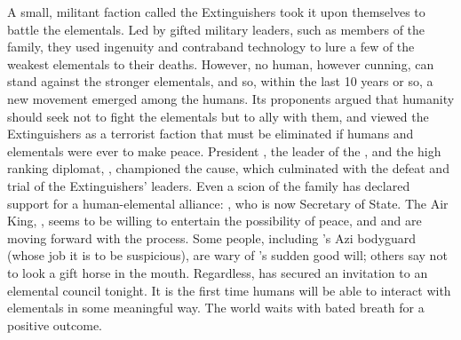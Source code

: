 \documentclass[blue]{elementals}
\begin{document}
A small, militant faction called the Extinguishers took it upon themselves to battle the elementals.  Led by gifted military leaders, such as members of the \cDema{\formal} family, they used ingenuity and contraband technology to lure a few of the weakest elementals to their deaths.  However, no human, however cunning, can stand against the stronger elementals, and so, within the last 10 years or so, a new movement emerged among the humans. Its proponents argued that humanity should seek not to fight the elementals but to ally with them, and viewed the Extinguishers as a terrorist faction that must be eliminated if humans and elementals were ever to make peace. President \cLeader{\full}, the leader of the \cNewUN{}, and the high ranking diplomat, \cAvatar{\full}, championed the cause, which culminated with the defeat and trial of the Extinguishers' leaders. Even a scion of the \cDema{\formal} family has declared support for a human-elemental alliance: \cDema{}, who is now Secretary of State. The Air King, \cKing{}, seems to be willing to entertain the possibility of peace, and \cLeader{} and \cAvatar{} are moving forward with the process. Some people, including \cLeader{}'s Azi bodyguard \cRomeo{\full} (whose job it is to be suspicious), are wary of \cKing{}'s sudden good will; others say not to look a gift horse in the mouth. Regardless, \cLeader{} has secured an invitation to an elemental council tonight. It is the first time humans will be able to interact with elementals in some meaningful way. The world waits with bated breath for a positive outcome.

\end{document}
